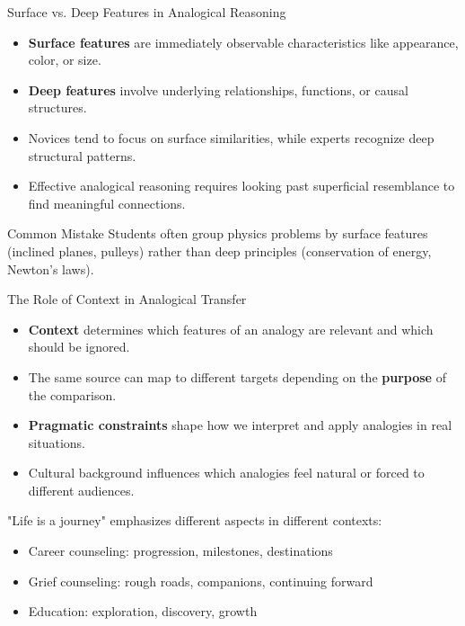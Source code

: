 \documentclass{beamer}
\begin{document}
	
	\begin{frame}{Surface vs. Deep Features in Analogical Reasoning}
		\begin{itemize}
			\item \textbf{Surface features} are immediately observable characteristics like appearance, color, or size.
			\item \textbf{Deep features} involve underlying relationships, functions, or causal structures.
			\item Novices tend to focus on surface similarities, while experts recognize deep structural patterns.
			\item Effective analogical reasoning requires looking past superficial resemblance to find meaningful connections.
		\end{itemize}
		
		\begin{alertblock}{Common Mistake}
			Students often group physics problems by surface features (inclined planes, pulleys) rather than deep principles (conservation of energy, Newton's laws).
		\end{alertblock}
	\end{frame}
	
	\begin{frame}{The Role of Context in Analogical Transfer}
		\begin{itemize}
			\item \textbf{Context} determines which features of an analogy are relevant and which should be ignored.
			\item The same source can map to different targets depending on the \textbf{purpose} of the comparison.
			\item \textbf{Pragmatic constraints} shape how we interpret and apply analogies in real situations.
			\item Cultural background influences which analogies feel natural or forced to different audiences.
		\end{itemize}
		
		\begin{example}
			"Life is a journey" emphasizes different aspects in different contexts:
			\begin{itemize}
				\item Career counseling: progression, milestones, destinations
				\item Grief counseling: rough roads, companions, continuing forward
				\item Education: exploration, discovery, growth
			\end{itemize}
		\end{example}
	\end{frame}
	
\end{document}
